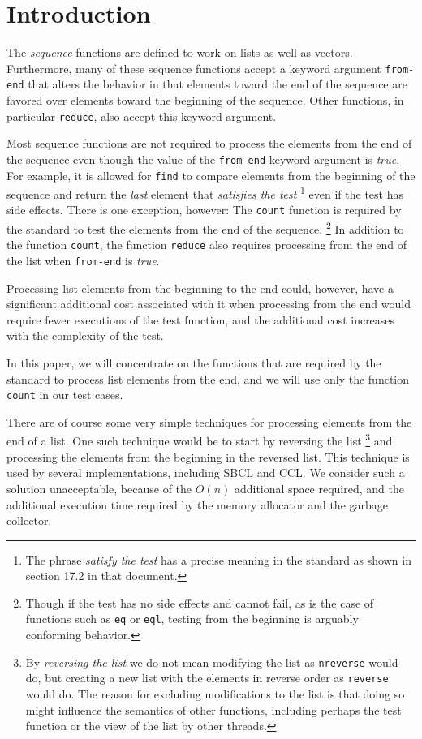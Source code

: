 \section{Introduction}

The \commonlisp{} \emph{sequence} functions are defined to work on
lists as well as vectors.  Furthermore, many of these sequence
functions accept a keyword argument \texttt{from-end} that alters the
behavior in that elements toward the end of the sequence are favored
over elements toward the beginning of the sequence.  Other functions,
in particular \texttt{reduce}, also accept this keyword argument.

Most sequence functions are not required to process the elements from
the end of the sequence even though the value of the \texttt{from-end}
keyword argument is \emph{true}.  For example, it is allowed for
\texttt{find} to compare elements from the beginning of the sequence
and return the \emph{last} element that \emph{satisfies the test}%
\footnote{The phrase \emph{satisfy the test} has a precise meaning in
  the \commonlisp{} standard as shown in section 17.2 in that
  document.}  even if the test has side effects.  There is one
exception, however: The \texttt{count} function is required by the
standard to test the elements from the end of the sequence.%
\footnote{Though if the test has no side effects and cannot fail, as
  is the case of functions such as \texttt{eq} or \texttt{eql},
  testing from the beginning is arguably conforming behavior.}
In addition to the function \texttt{count}, the function
\texttt{reduce} also requires processing from the end of the list when
\texttt{from-end} is \emph{true}.

Processing list elements from the beginning to the end could, however,
have a significant additional cost associated with it when processing
from the end would require fewer executions of the test function, and
the additional cost increases with the complexity of the test.

In this paper, we will concentrate on the functions that are required
by the standard to process list elements from the end, and we will use
only the function \texttt{count} in our test cases.

There are of course some very simple techniques for processing elements
from the end of a list.
One such technique would be to start by reversing the list%
\footnote{By \emph{reversing the list} we do not mean modifying the
  list as \texttt{nreverse} would do, but creating a new list with the
  elements in reverse order as \texttt{reverse} would do.  The reason
  for excluding modifications to the list is that doing so might
  influence the semantics of other functions, including perhaps the
  test function or the view of the list by other threads.}
and processing the elements from the beginning in the reversed list.
This technique is used by several implementations, including SBCL and
CCL.
We consider such a solution unacceptable, because of the $O(n)$
additional space required, and the additional execution time required
by the memory allocator and the garbage collector.

